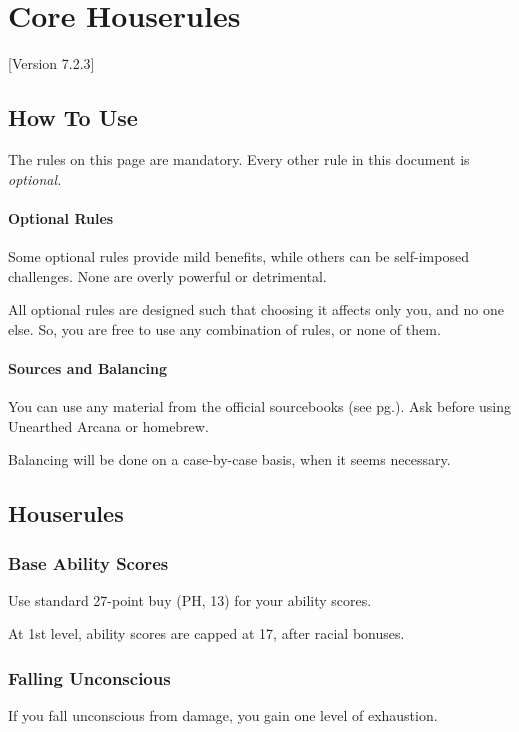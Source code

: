 \documentclass[letterpaper,twocolumn,openany,nodeprecatedcode]{dndbook}
\newcommand{\pg}[1]{pg.\pageref{#1}}
\newcommand{\see}[1]{(see \pg{#1})}
\begin{document}




\chapter{Core Houserules}

[Version 7.2.3]

\section{How To Use}
The rules on this page are mandatory. Every other rule in this document is \textit{optional.} 

\subsubsection{Optional Rules}
Some optional rules provide mild benefits, while others can be self-imposed challenges. None are overly powerful or detrimental. 

All optional rules are designed such that choosing it affects only you, and no one else. So, you are free to use any combination of rules, or none of them.

\subsubsection{Sources and Balancing}
You can use any material from the official sourcebooks \see{sources}. Ask before using Unearthed Arcana or homebrew.

Balancing will be done on a case-by-case basis, when it seems necessary. 

\newpage
\section{Houserules}

\subsection{Base Ability Scores}
Use standard 27-point buy (PH, 13) for your ability scores. 

At 1st level, ability scores are capped at 17, after racial bonuses.

\subsection{Falling Unconscious}
If you fall unconscious from damage, you gain one level of exhaustion.
\end{document}
